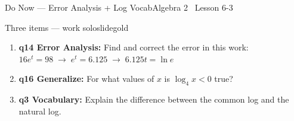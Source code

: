 \documentclass[aspectratio=169, 11pt]{beamer}
\begin{document}

\begin{frame}{Do Now --- Error Analysis + Log Vocab}{Algebra 2 \textperiodcentered\ Lesson 6-3}
\vspace{0.2cm}
\begin{projcard}{Three items --- work solo}{slidegold}
\begin{enumerate}
  \setlength{\itemsep}{0.1cm}
  \item \textbf{q14 Error Analysis:} Find and correct the error in this work:
        \(\displaystyle 16e^t = 98 \;\rightarrow\; e^t = 6.125 \;\rightarrow\; 6.125t = \ln e\)
  \item \textbf{q16 Generalize:} For what values of \(x\) is \(\log_4 x < 0\) true?
  \item \textbf{q3 Vocabulary:} Explain the difference between the common log and the natural log.
\end{enumerate}
\end{projcard}
\end{frame}
\end{document}
